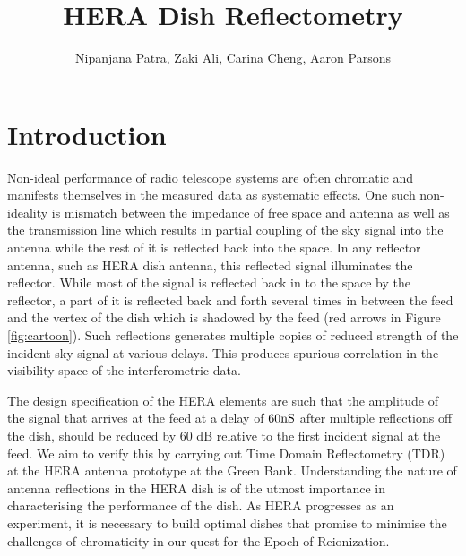 \documentclass[12pt,preprint]{aastex}
\begin{document}
\title{HERA Dish Reflectometry} 
\author{Nipanjana Patra, Zaki Ali, Carina Cheng, Aaron Parsons}
\maketitle

\section{Introduction}

Non-ideal performance of radio telescope systems are often chromatic and manifests themselves in the measured data as systematic effects. One such non-ideality is mismatch between the impedance of free space and antenna as well as the transmission line which results in partial coupling of the sky signal into the antenna while the rest of it is reflected back into the space. In any reflector antenna, such as HERA dish antenna, this reflected signal illuminates the reflector. While most of the signal is reflected back in to the space by the reflector,  a part of it is reflected back and forth several times in between the feed and the vertex of the dish which is shadowed by the feed (red arrows in Figure \ref{fig:cartoon}). Such reflections generates multiple copies of reduced strength of the incident sky signal at various delays. This produces spurious correlation in the visibility space of the interferometric data. 


 The design specification of the HERA elements are such that the amplitude of the signal that arrives at the feed at a delay of $60 \rm nS$ after multiple reflections off the dish, should be reduced by 60 dB relative to the first incident signal at the feed. We aim to verify this by carrying out Time Domain Reflectometry (TDR) at the HERA antenna prototype at the Green Bank. Understanding the nature of antenna reflections in the HERA dish is of the
utmost importance in characterising the performance of the dish. As HERA
progresses as an experiment, it is necessary to build optimal dishes that
promise to minimise the challenges of chromaticity in our quest for the Epoch
of Reionization.
\end{document}
